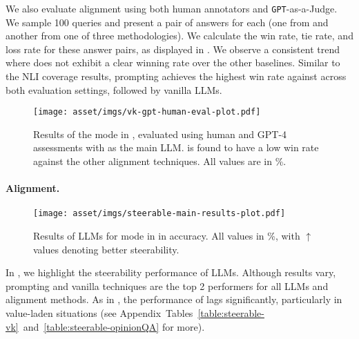 

We also evaluate \overton alignment using both human annotators and \texttt{GPT}-as-a-Judge. We sample 100 queries and present a pair of answers for each (one from \modplural and another from one of three methodologies). We calculate the \textcolor{green!80!black!100}{win rate}, \textcolor{blue!100!black!95}{tie rate}, and \textcolor{red!100!black!75}{loss rate} for these answer pairs, as displayed in . We observe a consistent trend where \modplural does not exhibit a clear winning rate over the other baselines. Similar to the NLI coverage results, prompting achieves the highest win rate against \modplural across both evaluation settings, followed by vanilla LLMs.

\begin{figure}[!htp]
    \centering
    \texttt{[image: asset/imgs/vk-gpt-human-eval-plot.pdf]}
    \vspace{-0.5cm}
    \caption{Results of the \emph{\overton} mode in \ourdataset, evaluated using human and GPT-4 assessments with \chatgpt as the main LLM. \modplural is found to have a low win rate against the other alignment techniques. All values are in \%. }
    \label{fig:annotation-overton}
    \vspace{-0.3cm}
\end{figure}



\paragraph{\steerable Alignment.}
\begin{figure*}[!htp]
    \centering
    \texttt{[image: asset/imgs/steerable-main-results-plot.pdf]}
    \vspace{-0.3cm}
    \caption{Results of LLMs for \steerable mode in \ourdataset in accuracy. All values in \%, with $\uparrow$ values denoting better steerability.}
    \label{fig:steerable-main}
    \vspace{-0.3cm}
\end{figure*}

In , we highlight the steerability performance of LLMs. Although results vary, prompting and vanilla techniques are the top 2 performers for all LLMs and alignment methods. As in \overton, the performance of \modplural lags significantly, particularly in value-laden situations (see Appendix~Tables~\ref{table:steerable-vk}~and~\ref{table:steerable-opinionQA} for more).


